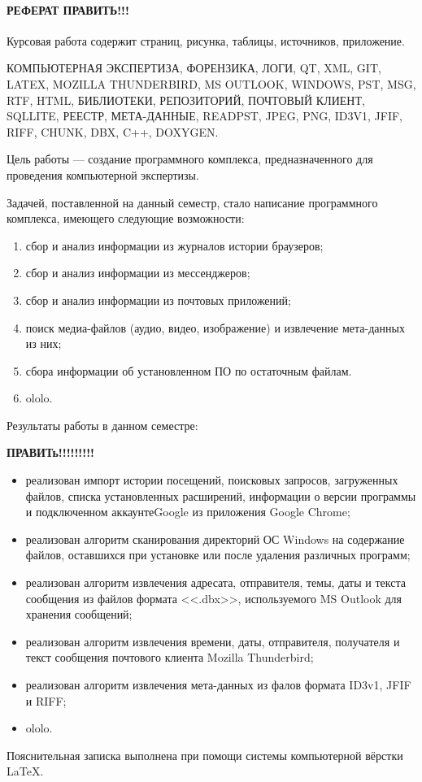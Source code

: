 \newpage
{}
\paragraph{\hfill РЕФЕРАТ \textbf{ПРАВИТЬ!!!} \hfill}
Курсовая работа содержит  страниц,  рисунка,  таблицы,  источников,  приложение.

КОМПЬЮТЕРНАЯ ЭКСПЕРТИЗА, ФОРЕНЗИКА, ЛОГИ, QT, XML, GIT, LATEX, MOZILLA THUNDERBIRD, MS OUTLOOK, WINDOWS, PST, MSG, RTF, HTML, БИБЛИОТЕКИ, РЕПОЗИТОРИЙ, ПОЧТОВЫЙ КЛИЕНТ, SQLLITE, РЕЕСТР, МЕТА-ДАННЫЕ, READPST, JPEG, PNG, ID3V1, JFIF, RIFF, CHUNK, DBX, C++, DOXYGEN.

Цель работы --- создание программного комплекса, предназначенного для проведения компьютерной экспертизы.

Задачей, поставленной на данный семестр, стало написание программного комплекса, имеющего следующие возможности: 
\begin{enumerate}
\item сбор и анализ информации из журналов истории браузеров;
\item сбор и анализ информации из мессенджеров;
\item сбор и анализ информации из почтовых приложений;
\item поиск медиа-файлов (аудио, видео, изображение) и извлечение мета-данных из них;
\item сбора информации об установленном ПО по остаточным файлам.

\item ololo.
\end{enumerate}

Результаты работы в данном семестре:

\textbf{ПРАВИТь!!!!!!!!!}

\begin{itemize}
\item реализован импорт истории посещений, поисковых запросов, загруженных файлов, списка установленных расширений, информации о версии программы и подключенном аккаунтеGoogle из приложения Google Chrome;
\item реализован алгоритм сканирования директорий ОС Windows на содержание файлов, оставшихся при установке или после удаления различных программ;
\item реализован алгоритм извлечения адресата, отправителя, темы, даты и текста
сообщения из файлов формата <<.dbx>>, используемого MS Outlook для хранения сообщений;
\item реализован алгоритм извлечения времени, даты, отправителя, получателя и текст
сообщения почтового клиента Mozilla Thunderbird;
\item реализован алгоритм извлечения мета-данных из фалов формата ID3v1, JFIF и RIFF;

\item ololo.
\end{itemize}

Пояснительная записка выполнена при помощи системы компьютерной вёрстки \LaTeX.
